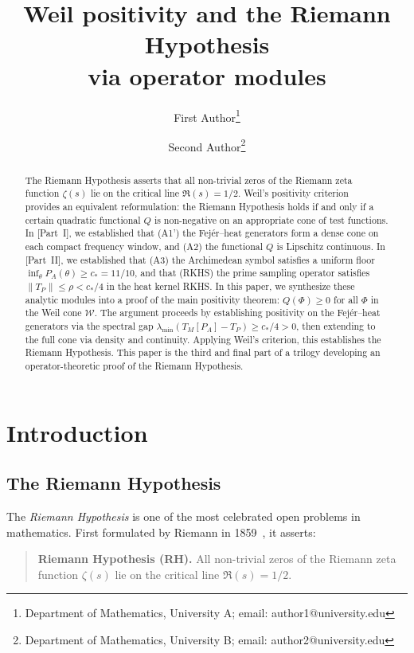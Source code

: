 \documentclass[11pt,a4paper]{article}
\title{Weil positivity and the Riemann Hypothesis\\via operator modules}
\author{
  {\sc First Author}\thanks{Department of Mathematics, University A; email: author1@university.edu}
  \and
  {\sc Second Author}\thanks{Department of Mathematics, University B; email: author2@university.edu}
}
\date{}
\theoremstyle{definition}
\theoremstyle{remark}
\begin{document}
\maketitle

\begin{abstract}
The Riemann Hypothesis asserts that all non-trivial zeros of the Riemann zeta function $\zeta(s)$ lie on the critical line $\Re(s) = 1/2$. Weil's positivity criterion~\cite{Weil1952,Weil1972} provides an equivalent reformulation: the Riemann Hypothesis holds if and only if a certain quadratic functional $Q$ is non-negative on an appropriate cone of test functions. In [Part~I], we established that (A1') the Fej\'er--heat generators form a dense cone on each compact frequency window, and (A2) the functional $Q$ is Lipschitz continuous. In [Part~II], we established that (A3) the Archimedean symbol satisfies a uniform floor $\inf_\theta P_A(\theta) \geq c_* = 11/10$, and that (RKHS) the prime sampling operator satisfies $\|T_P\| \leq \rho < c_*/4$ in the heat kernel RKHS. In this paper, we synthesize these analytic modules into a proof of the main positivity theorem: $Q(\Phi) \geq 0$ for all $\Phi$ in the Weil cone $\mathcal{W}$. The argument proceeds by establishing positivity on the Fej\'er--heat generators via the spectral gap $\lambda_{\min}(T_M[P_A] - T_P) \geq c_*/4 > 0$, then extending to the full cone via density and continuity. Applying Weil's criterion, this establishes the Riemann Hypothesis. This paper is the third and final part of a trilogy developing an operator-theoretic proof of the Riemann Hypothesis.
\end{abstract}

\tableofcontents

\section{Introduction}

\subsection{The Riemann Hypothesis}

The \emph{Riemann Hypothesis} is one of the most celebrated open problems in mathematics. First formulated by Riemann in 1859~\cite{Riemann1859}, it asserts:

\begin{quote}
\textbf{Riemann Hypothesis (RH).} All non-trivial zeros of the Riemann zeta function $\zeta(s)$ lie on the critical line $\Re(s) = 1/2$.
\end{quote}
\end{document}
